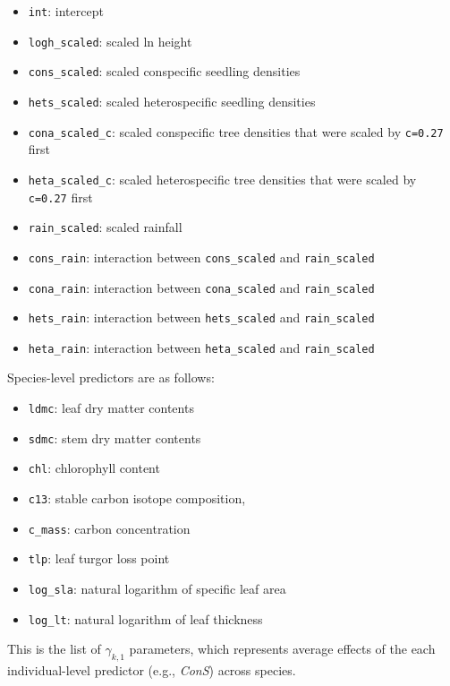 \documentclass[
  11pt,
  letterpaper,
  DIV=11,
  numbers=noendperiod]{scrartcl}
\providecommand{\tightlist}{%
  \setlength{\itemsep}{0pt}\setlength{\parskip}{0pt}}\usepackage{longtable,booktabs,array}
\begin{document}
\begin{itemize}
\tightlist
\item
  \texttt{int}: intercept
\item
  \texttt{logh\_scaled}: scaled ln height
\item
  \texttt{cons\_scaled}: scaled conspecific seedling densities
\item
  \texttt{hets\_scaled}: scaled heterospecific seedling densities
\item
  \texttt{cona\_scaled\_c}: scaled conspecific tree densities that were
  scaled by \texttt{c=0.27} first
\item
  \texttt{heta\_scaled\_c}: scaled heterospecific tree densities that
  were scaled by \texttt{c=0.27} first
\item
  \texttt{rain\_scaled}: scaled rainfall
\item
  \texttt{cons\_rain}: interaction between \texttt{cons\_scaled} and
  \texttt{rain\_scaled}
\item
  \texttt{cona\_rain}: interaction between \texttt{cona\_scaled} and
  \texttt{rain\_scaled}
\item
  \texttt{hets\_rain}: interaction between \texttt{hets\_scaled} and
  \texttt{rain\_scaled}
\item
  \texttt{heta\_rain}: interaction between \texttt{heta\_scaled} and
  \texttt{rain\_scaled}
\end{itemize}

Species-level predictors are as follows:

\begin{itemize}
\tightlist
\item
  \texttt{ldmc}: leaf dry matter contents
\item
  \texttt{sdmc}: stem dry matter contents
\item
  \texttt{chl}: chlorophyll content
\item
  \texttt{c13}: stable carbon isotope composition,
\item
  \texttt{c\_mass}: carbon concentration
\item
  \texttt{tlp}: leaf turgor loss point
\item
  \texttt{log\_sla}: natural logarithm of specific leaf area
\item
  \texttt{log\_lt}: natural logarithm of leaf thickness
\end{itemize}

This is the list of \(\gamma_{k,1}\) parameters, which represents
average effects of the each individual-level predictor (e.g.,
\emph{ConS}) across species.
\end{document}

